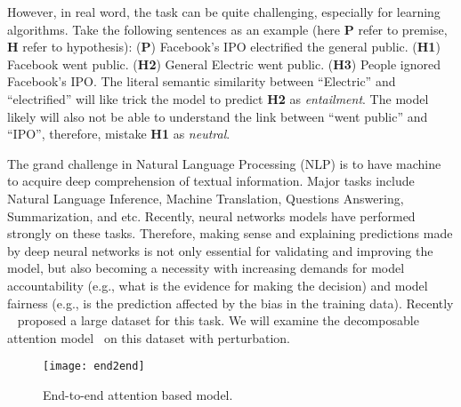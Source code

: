However, in real word, the task can be quite challenging, especially for learning algorithms. Take the following sentences as an example (here \textbf{P} refer to premise, \textbf{H} refer to hypothesis):  (\textbf{P}) Facebook's IPO electrified the general public. (\textbf{H1}) Facebook went public. (\textbf{H2}) General Electric went public. (\textbf{H3}) People ignored Facebook's IPO. The literal semantic similarity between ``Electric'' and ``electrified'' will like trick the model to predict \textbf{H2} as \emph{entailment}. The model likely will also not be able to understand the link between ``went public'' and ``IPO'', therefore, mistake \textbf{H1} as \emph{neutral}.

The grand challenge in Natural Language Processing (NLP) is to have machine to acquire
deep comprehension of textual information. Major tasks include Natural Language Inference,
Machine Translation, Questions Answering, Summarization, and etc.
Recently, neural networks models have performed strongly on these tasks.
%
Therefore, making sense and explaining predictions made by deep neural networks is not only
essential for validating and improving the model, but also becoming a necessity with
increasing demands for model accountability (e.g., what is the evidence for making the decision)
and model fairness (e.g., is the prediction affected by the bias in the training data).
%
Recently ~\cite{BowmanAngeliPotts2015} proposed a large dataset for this task. We will examine
the decomposable attention model~\cite{parikh2016emnlp} on this dataset with perturbation.



\begin{figure}[htbp]
\centering
\vspace{-2mm}
 \texttt{[image: end2end]}
 \caption{End-to-end attention based model.}
\label{fig:modelPipeline}
\end{figure}

